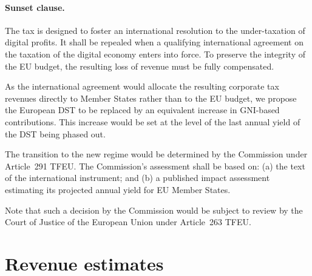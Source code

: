 \documentclass[../../main]{subfiles}
\begin{document}
\paragraph{Sunset clause.}
The tax is designed to foster an international resolution to the under-taxation of digital profits.
It shall be repealed when a qualifying international agreement on the taxation of the digital economy enters into force.
To preserve the integrity of the EU budget, the resulting loss of revenue must be fully compensated.

As the international agreement would allocate the resulting corporate tax revenues directly to Member States rather than to the EU budget, we propose the European DST to be replaced by an equivalent increase in GNI-based contributions. 
This increase would be set at the level of the last annual yield of the DST being phased out.

The transition to the new regime would be determined by the Commission under Article~291 TFEU.
The Commission's assessment shall be based on:
(a) the text of the international instrument; and
(b) a published impact assessment estimating its projected annual yield for EU Member States.

Note that such a decision by the Commission would be subject to review by the Court of Justice of the European Union under Article~263 TFEU.




\section{Revenue estimates}
\label{sec:revenue_estimates}
\end{document}
